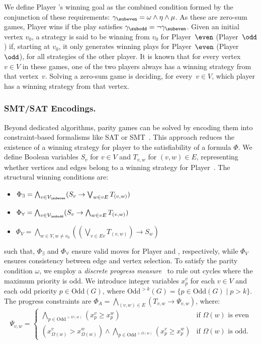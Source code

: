 \documentclass[runningheads]{llncs}
\begin{document}
We define Player \even's winning goal as the combined condition formed by the conjunction of these requirements:
$\gamma_{\subeven} = \omega \wedge \eta \wedge \mu$. As these are zero-sum games, Player \odd wins if the play satisfies $\gamma_{\subodd} = \neg \gamma_{\subeven}$.
%
Given an initial vertex $v_0$, a strategy is said to be winning from $v_0$ for Player~$\even$ (Player~$\odd$) if, starting at $v_0$, it only generates winning plays for Player~$\even$ (Player~$\odd$), for all strategies of the other player. It is known that for every vertex~$v\in V$ in these games, one of the two players always has a winning strategy from that vertex~$v$. Solving a zero-sum game is deciding, for every~$v\in V$, which player has a winning strategy from that vertex.

\subsubsection{SMT/SAT Encodings.}\label{sec:satencoding}

Beyond dedicated algorithms, parity games can be solved by encoding them into constraint-based formalisms like SAT or SMT~\cite{Heljanko:2012}. This approach reduces the existence of a winning strategy for player \even to the satisfiability of a formula $\Phi$. We define Boolean variables $S_v$ for $v \in V$ and $T_{v,w}$ for $(v, w) \in E$, representing whether vertices and edges belong to a winning strategy for Player~\even. The structural winning conditions are:

\begin{itemize}[itemsep=1.0ex, parsep=0pt]
    \item $\Phi_\exists = \bigwedge_{v \in V_{\subeven}} (S_v \rightarrow \bigvee_{w \in vE} T_{(v,w)})$ 
    \item $\Phi_\forall = \bigwedge_{v \in V_{\subodd}} (S_v \rightarrow \bigwedge_{w \in vE} T_{(v,w)})$
    \item $\Phi_V = \bigwedge_{w \in V, w \neq v_0} \left( \left(\bigvee_{v \in Ev} T_{(v,w)}\right) \rightarrow S_w \right)$
\end{itemize}
such that, 
$\Phi_\exists$ and $\Phi_\forall$ ensure valid moves for Player \even and \odd, respectively, while $\Phi_V$ ensures consistency between edge and vertex selection. To satisfy the parity condition $\omega$, we employ a \textit{discrete progress measure}~\cite{Jurdziński:2000} to rule out cycles where the maximum priority is odd. We introduce integer variables $x_p^v$ for each $v \in V$ and each odd priority $p \in \text{Odd}(G)$, where $\text{Odd}^{>k}(G) = \{p \in \text{Odd}(G) \mid p > k\}$. The progress constraints are $\Phi_A = \bigwedge_{(v,w) \in E} (T_{v,w} \to \Psi_{v,w})$, where:
%
\[
\Psi_{v,w} = 
\begin{cases} 
\bigwedge_{p \in \text{Odd}^{>\Omega(w)}} (x_p^v \geq x_p^w) & \text{if } \Omega(w) \text{ is even} \\
(x_{\Omega(w)}^v > x_{\Omega(w)}^w) \land \bigwedge_{p \in \text{Odd}^{>\Omega(w)}} (x_p^v \geq x_p^w) & \text{if } \Omega(w) \text{ is odd}.
\end{cases}
\]
\end{document}
